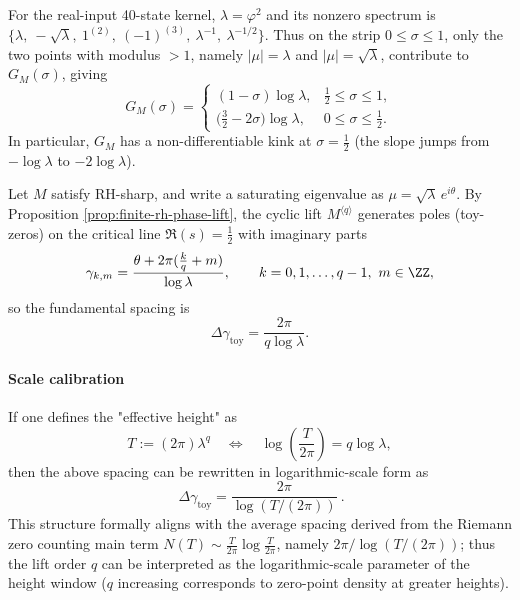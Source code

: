 \begin{corollary}[Critical kink for the real-input 40-state kernel: \texorpdfstring{$\sigma=\tfrac12$}{sigma=1/2}]\label{cor:real-input-40-jensen-kink}
For the real-input 40-state kernel, \(\lambda=\varphi^2\) and its nonzero spectrum is
\(\{\lambda,\ -\sqrt{\lambda},\ 1^{(2)},\ (-1)^{(3)},\ \lambda^{-1},\ \lambda^{-1/2}\}\).
Thus on the strip \(0\le \sigma\le 1\), only the two points with modulus \(>\!1\), namely \(|\mu|=\lambda\) and \(|\mu|=\sqrt{\lambda}\), contribute to \(G_M(\sigma)\), giving
\[
G_M(\sigma)=
\begin{cases}
(1-\sigma)\log\lambda,&\tfrac12\le \sigma\le 1,\\[4pt]
\bigl(\tfrac32-2\sigma\bigr)\log\lambda,&0\le \sigma\le \tfrac12.
\end{cases}
\]
In particular, \(G_M\) has a non-differentiable kink at \(\sigma=\tfrac12\) (the slope jumps from \(-\log\lambda\) to \(-2\log\lambda\)).
\end{corollary}

\begin{remark}[Height--scale calibration: aligning critical line comb tooth density via \texorpdfstring{$T=(2\pi)\lambda^q$}{T=(2pi)lambda^q}]\label{rem:finite-rh-height-scale-calibration}
Let \(M\) satisfy RH-sharp, and write a saturating eigenvalue as \(\mu=\sqrt{\lambda}\,e^{i\theta}\).
By Proposition \ref{prop:finite-rh-phase-lift}, the cyclic lift \(M^{\langle q\rangle}\) generates poles (toy-zeros) on the critical line \(\Re(s)=\tfrac12\) with imaginary parts
\[
\gamma_{k,m}=\frac{\theta+2\pi(\frac{k}{q}+m)}{\log\lambda},
\qquad k=0,1,\dots,q-1,\ m\in\ZZ,
\]
so the fundamental spacing is
\[
\Delta\gamma_{\mathrm{toy}}=\frac{2\pi}{q\log\lambda}.
\]
\paragraph{Scale calibration}
If one defines the "effective height" as
\[
T:=(2\pi)\lambda^q
\quad\Longleftrightarrow\quad
\log\!\left(\frac{T}{2\pi}\right)=q\log\lambda,
\]
then the above spacing can be rewritten in logarithmic-scale form as
\[
\boxed{\ \Delta\gamma_{\mathrm{toy}}=\frac{2\pi}{\log(T/(2\pi))}\ }.
\]
This structure formally aligns with the average spacing derived from the Riemann zero counting main term \(N(T)\sim \frac{T}{2\pi}\log\frac{T}{2\pi}\), namely \(2\pi/\log(T/(2\pi))\); thus the lift order \(q\) can be interpreted as the logarithmic-scale parameter of the height window (\(q\) increasing corresponds to zero-point density at greater heights).
\end{remark}

